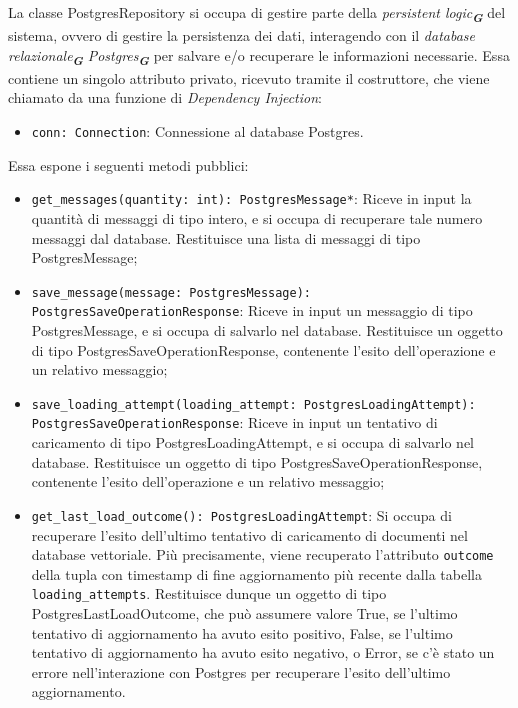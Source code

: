 \label{sec:postgres_repository}
La classe PostgresRepository si occupa di gestire parte della \emph{persistent logic}\textsubscript{\textbf{\textit{G}}} del sistema, ovvero di gestire la persistenza dei dati, interagendo con il \emph{database relazionale}\textsubscript{\textbf{\textit{G}}} \emph{Postgres}\textsubscript{\textbf{\textit{G}}} per salvare e/o recuperare le informazioni necessarie. 
Essa contiene un singolo attributo privato, ricevuto tramite il costruttore, che viene chiamato da una funzione di \emph{Dependency Injection}:
\begin{itemize}
    \item \texttt{conn: Connection}: Connessione al database Postgres.
\end{itemize}
Essa espone i seguenti metodi pubblici:
\begin{itemize}
    \item \texttt{get\_messages(quantity: int): PostgresMessage*}: Riceve in input la quantità di messaggi di tipo intero, e si occupa di recuperare tale numero messaggi dal database. Restituisce una lista di messaggi di tipo PostgresMessage;
    \item \texttt{save\_message(message: PostgresMessage): PostgresSaveOperationResponse}: Riceve in input un messaggio di tipo PostgresMessage, e si occupa di salvarlo nel database. Restituisce un oggetto di tipo PostgresSaveOperationResponse, contenente l'esito dell'operazione e un relativo messaggio;
    \item \texttt{save\_loading\_attempt(loading\_attempt: PostgresLoadingAttempt):\\ PostgresSaveOperationResponse}: Riceve in input un tentativo di caricamento di tipo PostgresLoadingAttempt, e si occupa di salvarlo nel database. Restituisce un oggetto di tipo PostgresSaveOperationResponse, contenente l'esito dell'operazione e un relativo messaggio;
    \item \texttt{get\_last\_load\_outcome(): PostgresLoadingAttempt}: Si occupa di recuperare l'esito dell'ultimo tentativo di caricamento di documenti nel database vettoriale. Più precisamente, viene recuperato l'attributo \texttt{outcome} della tupla con timestamp di fine aggiornamento più recente dalla tabella \texttt{loading\_attempts}. Restituisce dunque un oggetto di tipo PostgresLastLoadOutcome, che può assumere valore True, se l'ultimo tentativo di aggiornamento ha avuto esito positivo, False, se l'ultimo tentativo di aggiornamento ha avuto esito negativo, o Error, se c'è stato un errore nell'interazione con Postgres per recuperare l'esito dell'ultimo aggiornamento.
\end{itemize}

